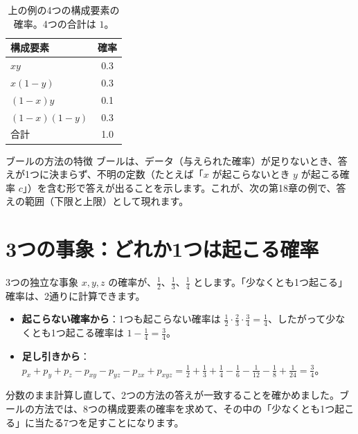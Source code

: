 \documentclass[a4paper,11pt,openany]{ltjsbook}
\begin{document}
\begin{table}[htbp]
\centering
\begin{tabular}{lc}
\toprule
構成要素 & 確率\\
\midrule
$xy$ & 0.3\\
$x(1-y)$ & 0.3\\
$(1-x)y$ & 0.1\\
$(1-x)(1-y)$ & 0.3\\
\midrule
合計 & 1.0\\
\bottomrule
\end{tabular}
\caption{上の例の4つの構成要素の確率。4つの合計は $1$。}
\end{table}

\begin{notebox}{ブールの方法の特徴}
ブールは、データ（与えられた確率）が足りないとき、答えが1つに決まらず、不明の定数（たとえば「$x$ が起こらないとき $y$ が起こる確率 $c$」）を含む形で答えが出ることを示します。これが、次の第18章の例で、答えの範囲（下限と上限）として現れます。
\end{notebox}

\section{3つの事象：どれか1つは起こる確率}

3つの独立な事象 $x,y,z$ の確率が、$\tfrac12$、$\tfrac13$、$\tfrac14$ とします。「少なくとも1つ起こる」確率は、2通りに計算できます。

\begin{itemize}[leftmargin=*]
\item \textbf{起こらない確率から}：1つも起こらない確率は $\tfrac12\cdot\tfrac23\cdot\tfrac34=\tfrac14$、したがって少なくとも1つ起こる確率は $1-\tfrac14=\tfrac34$。
\item \textbf{足し引きから}：$p_x+p_y+p_z-p_{xy}-p_{yz}-p_{zx}+p_{xyz}=\tfrac12+\tfrac13+\tfrac14-\tfrac16-\tfrac1{12}-\tfrac18+\tfrac1{24}=\tfrac34$。
\end{itemize}

分数のまま計算し直して、2つの方法の答えが一致することを確かめました。ブールの方法では、8つの構成要素の確率を求めて、その中の「少なくとも1つ起こる」に当たる7つを足すことになります。
\end{document}
